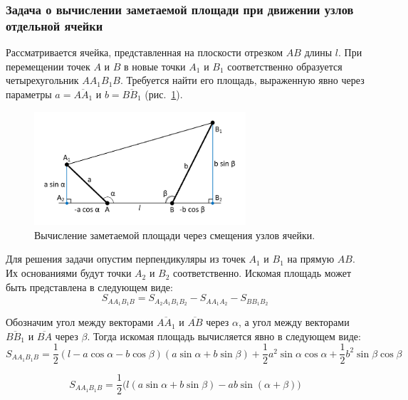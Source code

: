 \subsubsection{Задача о вычислении заметаемой площади при движении узлов отдельной ячейки}

Рассматривается ячейка, представленная на плоскости отрезком $AB$ длины $l$.
При перемещении точек $A$ и $B$ в новые точки $A_1$ и $B_1$ соответственно образуется четырехугольник $AA_1B_1B$.
Требуется найти его площадь, выраженную явно через параметры $a = \overline{AA_1}$ и $b = \overline{BB_1}$ (рис.~\ref{fig:text_1_remesh_2d_local}).

\begin{figure}[h]
\centering
\includegraphics[width=0.7\textwidth]{pics/text_1_remesh_2d/local.pdf}
\caption{Вычисление заметаемой площади через смещения узлов ячейки.}
\label{fig:text_1_remesh_2d_local}
\end{figure}

Для решения задачи опустим перпендикуляры из точек $A_1$ и $B_1$ на прямую $AB$.
Их основаниями будут точки $A_2$ и $B_2$ соответственно.
Искомая площадь может быть представлена в следующем виде:
\begin{equation}
S_{AA_1B_1B} = S_{A_2A_1B_1B_2} - S_{AA_1A_2} - S_{BB_1B_2}
\end{equation}

Обозначим угол между векторами $\overline{AA_1}$ и $\overline{AB}$ через $\alpha$, а угол между векторами $\overline{BB_1}$ и $\overline{BA}$ через $\beta$.
Тогда искомая площадь вычисляется явно в следующем виде:
\begin{equation}
S_{AA_1B_1B} = \frac{1}{2}(l - a \cos \alpha - b \cos \beta)(a \sin \alpha + b \sin \beta) + \frac{1}{2}a^2 \sin \alpha \cos \alpha + \frac{1}{2}b^2 \sin \beta \cos \beta
\end{equation}

\begin{equation}\label{eqn:text_1_remesh2_loca_square}
S_{AA_1B_1B} = \frac{1}{2}\big(l(a \sin \alpha + b \sin \beta) - ab \sin(\alpha + \beta)\big)
\end{equation}

